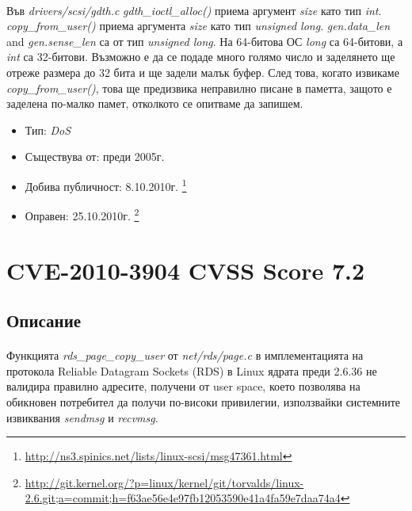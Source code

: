 \documentclass[a4paper,12pt,leqno]{article}
\begin{document}
\paragraph{}
Във \textit{drivers/scsi/gdth.c}
\textit{gdth\_ioctl\_alloc()} приема аргумент \textit{size} като тип \textit{int}.
\textit{copy\_from\_user()} приема аргумента \textit{size} като тип \textit{unsigned long}.
\textit{gen.data\_len} and \textit{gen.sense\_len} са от тип \textit{unsigned long}.
На 64-битова ОС \textit{long} са 64-битови, а \textit{int} са 32-битови.
Възможно е да се подаде много голямо число и заделянето ще отреже размера до 32 бита
и ще задели малък буфер. След това, когато извикаме \textit{copy\_from\_user()},
това ще предизвика неправилно писане в паметта, защото е заделена по-малко памет,
отколкото се опитваме да запишем.
\begin{itemize}
    \item Тип: \textit{DoS}
    \item Съществува от: преди 2005г.
  	\item Добива публичност: 8.10.2010г. \footnote{\url{http://ns3.spinics.net/lists/linux-scsi/msg47361.html}}
    \item Оправен: 25.10.2010г. \footnote{\url{http://git.kernel.org/?p=linux/kernel/git/torvalds/linux-2.6.git;a=commit;h=f63ae56e4e97fb12053590e41a4fa59e7daa74a4}}
\end{itemize}





\section{CVE-2010-3904 CVSS Score 7.2}
\subsection{Описание}
\paragraph{}
Функцията \textit{rds\_page\_copy\_user} от  \textit{net/rds/page.c} в имплементацията на протокола Reliable Datagram Sockets (RDS) в Linux ядрата преди 2.6.36 не валидира правилно адресите, получени от user space, което позволява на обикновен потребител да получи по-високи привилегии, използвайки системните извиквания \textit{sendmsg} и \textit{recvmsg}.\\
\end{document}
